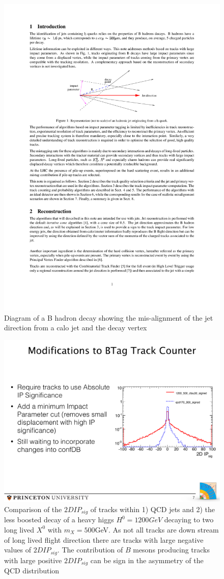 \begin{figure}
\begin{center}
\includegraphics[width=.7\textwidth]{figures/an_jetid/DIAGRAMS/b_diagram}
\end{center}
\caption{Diagram of a B hadron decay showing the mis-alignment of the jet direction from a calo jet and the decay vertex}
\label{fig:bdiagram}
\end{figure}



\begin{figure}
\begin{center}
\includegraphics[width=.7\textwidth]{figures/an_jetid/signed_2dipsig}
\end{center}
\caption{Comparison of the $2DIP_{sig}$ of tracks within 1) QCD jets and 2) the less boosted decay of a heavy higgs $H^0=1200 GeV$ decaying to two long lived
$X^{0}$ with $m_{X}=500$GeV. As not all tracks are down stream of long lived flight direction there are tracks with large negative values of $2DIP_{sig}$. The
contribution of $B$ mesons producing tracks with large positive $2DIP_{sig}$  can be sign in the asymmetry of the QCD distribution  }
\label{fig:2dipsig_sign}
\end{figure}


